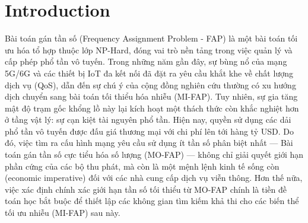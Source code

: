 
\section{Introduction}

Bài toán gán tần số (Frequency Assignment Problem - FAP) là một bài toán tối ưu hóa tổ hợp thuộc lớp NP-Hard, đóng vai trò nền tảng trong việc quản lý và cấp phép phổ tần vô tuyến. Trong những năm gần đây, sự bùng nổ của mạng 5G/6G và các thiết bị IoT đa kết nối đã đặt ra yêu cầu khắt khe về chất lượng dịch vụ (QoS), dẫn đến sự chú ý của cộng đồng nghiên cứu thường có xu hướng dịch chuyển sang bài toán tối thiểu hóa nhiễu (MI-FAP). Tuy nhiên, sự gia tăng mật độ trạm gốc khổng lồ này lại kích hoạt một thách thức còn khắc nghiệt hơn ở tầng vật lý: sự cạn kiệt tài nguyên phổ tần. Hiện nay, quyền sử dụng các dải phổ tần vô tuyến được đấu giá thương mại với chi phí lên tới hàng tỷ USD. Do đó, việc tìm ra cấu hình mạng yêu cầu sử dụng ít tần số phân biệt nhất — Bài toán gán tần số cực tiểu hóa số lượng (MO-FAP) — không chỉ giải quyết giới hạn phần cứng của các bộ thu phát, mà còn là một mệnh lệnh kinh tế sống còn (economic imperative) đối với các nhà cung cấp dịch vụ viễn thông. Hơn thế nữa, việc xác định chính xác giới hạn tần số tối thiểu từ MO-FAP chính là tiền đề toán học bắt buộc để thiết lập các không gian tìm kiếm khả thi cho các biến thể tối ưu nhiễu (MI-FAP) sau này.

